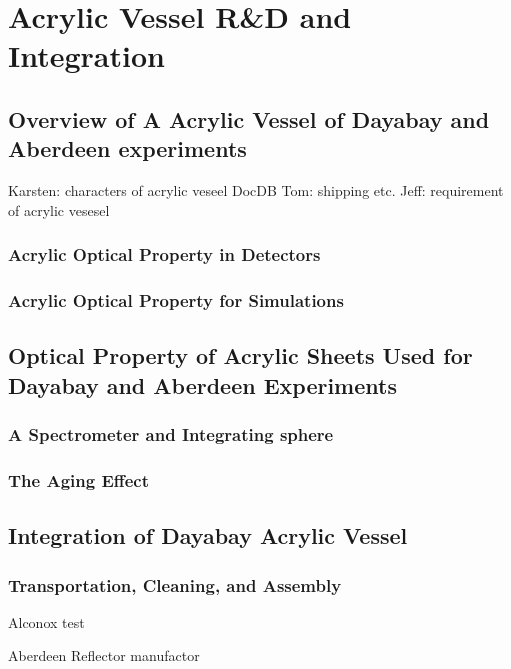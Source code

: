 \chapter {Acrylic Vessel R\&D and Integration}

\section {Overview of A Acrylic Vessel of Dayabay and Aberdeen experiments}

Karsten: characters of acrylic veseel DocDB
Tom: shipping etc.
Jeff: requirement of acrylic vesesel

\subsection {Acrylic Optical Property in Detectors}

\subsection {Acrylic Optical Property for Simulations}

\section {Optical Property of Acrylic Sheets Used for Dayabay and Aberdeen Experiments}

\subsection {A Spectrometer and Integrating sphere}

\subsection {The Aging Effect}


\section {Integration of Dayabay Acrylic Vessel}

\subsection {Transportation, Cleaning, and Assembly}

Alconox test

Aberdeen Reflector manufactor
